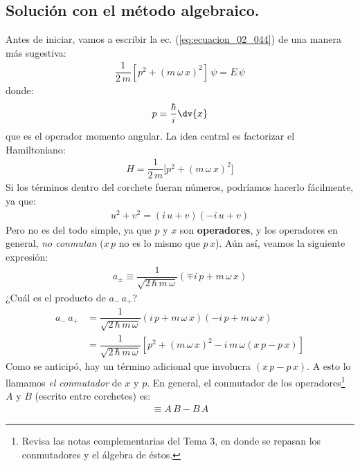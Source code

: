 \subsection{Solución con el método algebraico.}

Antes de iniciar, vamos a escribir la ec. (\ref{eq:ecuacion_02_044}) de una manera más sugestiva:
\begin{align}
\dfrac{1}{2 \, m} \left[ p^{2} + (m \, \omega \, x)^{2} \right] \, \psi = E \, \psi
\label{eq:ecuacion_02_045}
\end{align}
donde:
\begin{align*}
p = \dfrac{\hbar}{i} \dv{x}
\end{align*}
que es el operador momento angular. La idea central es factorizar el Hamiltoniano:
\begin{align}
H = \dfrac{1}{2 \, m} \big[ p^{2} + (m \, \omega \, x)^{2} \big]
\label{eq:ecuacion_02_046}
\end{align}
Si los términos dentro del corchete fueran números, podríamos hacerlo fácilmente, ya que:
\begin{align*}
u^{2} + v^{2} = ( i \, u +  v)(- i \, u + v)
\end{align*}
Pero no es del todo simple, ya que $p$ y $x$ son \textbf{operadores}, y los operadores en general, \textit{no conmutan} ($x \, p$ no es lo mismo que $p \, x$). Aún así, veamos la siguiente expresión:
\begin{align}
a_{\pm} \equiv \dfrac{1}{\sqrt{2 \, \hbar \, m \, \omega }} \left( \mp i \, p + m \, \omega \, x \right)
\label{eq:ecuacion_02_047}
\end{align}
¿Cuál es el producto de $a_{-} \, a_{+}$?
\begin{align*}
a_{-} \, a_{+} &= \dfrac{1}{\sqrt{2 \, \hbar \, m \, \omega }} \left( i \, p + m \, \omega \, x \right) \left( - i \, p + m \, \omega \, x \right) \\[0.5em]
&= \dfrac{1}{\sqrt{2 \, \hbar \, m \, \omega }} \left[ p^{2} + (m \, \omega \, x)^{2} - i \, m \, \omega (x \, p - p \, x) \right]
\end{align*}
Como se anticipó, hay un término adicional que involucra $(x \, p - p \, x)$. A esto lo llamamos \emph{el conmutador} de $x$ y $p$. En general, el conmutador de los operadores\footnote{Revisa las notas complementarias del Tema 3, en donde se repasan los conmutadores y el álgebra de éstos.} $A$ y $B$ (escrito entre corchetes) es:
\begin{align}
[A, B] \equiv A \, B - B \, A
\label{eq:ecuacion_02_048}
\end{align}
